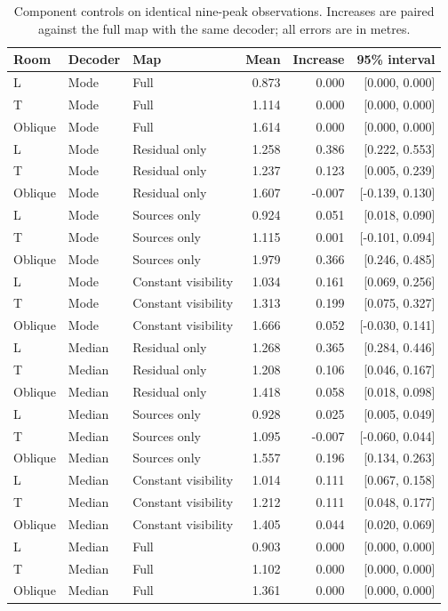 \begin{table}[H]
\centering
\small
\caption{Component controls on identical nine-peak observations. Increases are paired against the full map with the same decoder; all errors are in metres.}
\label{tab:suppcomponents}
\setlength{\tabcolsep}{4pt}
\begin{tabular}{lllrrr}
\toprule
Room & Decoder & Map & Mean & Increase & 95\% interval\\
\midrule
L & Mode & Full & 0.873 & 0.000 & [0.000, 0.000]\\
T & Mode & Full & 1.114 & 0.000 & [0.000, 0.000]\\
Oblique & Mode & Full & 1.614 & 0.000 & [0.000, 0.000]\\
L & Mode & Residual only & 1.258 & 0.386 & [0.222, 0.553]\\
T & Mode & Residual only & 1.237 & 0.123 & [0.005, 0.239]\\
Oblique & Mode & Residual only & 1.607 & -0.007 & [-0.139, 0.130]\\
L & Mode & Sources only & 0.924 & 0.051 & [0.018, 0.090]\\
T & Mode & Sources only & 1.115 & 0.001 & [-0.101, 0.094]\\
Oblique & Mode & Sources only & 1.979 & 0.366 & [0.246, 0.485]\\
L & Mode & Constant visibility & 1.034 & 0.161 & [0.069, 0.256]\\
T & Mode & Constant visibility & 1.313 & 0.199 & [0.075, 0.327]\\
Oblique & Mode & Constant visibility & 1.666 & 0.052 & [-0.030, 0.141]\\
L & Median & Residual only & 1.268 & 0.365 & [0.284, 0.446]\\
T & Median & Residual only & 1.208 & 0.106 & [0.046, 0.167]\\
Oblique & Median & Residual only & 1.418 & 0.058 & [0.018, 0.098]\\
L & Median & Sources only & 0.928 & 0.025 & [0.005, 0.049]\\
T & Median & Sources only & 1.095 & -0.007 & [-0.060, 0.044]\\
Oblique & Median & Sources only & 1.557 & 0.196 & [0.134, 0.263]\\
L & Median & Constant visibility & 1.014 & 0.111 & [0.067, 0.158]\\
T & Median & Constant visibility & 1.212 & 0.111 & [0.048, 0.177]\\
Oblique & Median & Constant visibility & 1.405 & 0.044 & [0.020, 0.069]\\
L & Median & Full & 0.903 & 0.000 & [0.000, 0.000]\\
T & Median & Full & 1.102 & 0.000 & [0.000, 0.000]\\
Oblique & Median & Full & 1.361 & 0.000 & [0.000, 0.000]\\
\bottomrule
\end{tabular}
\end{table}
